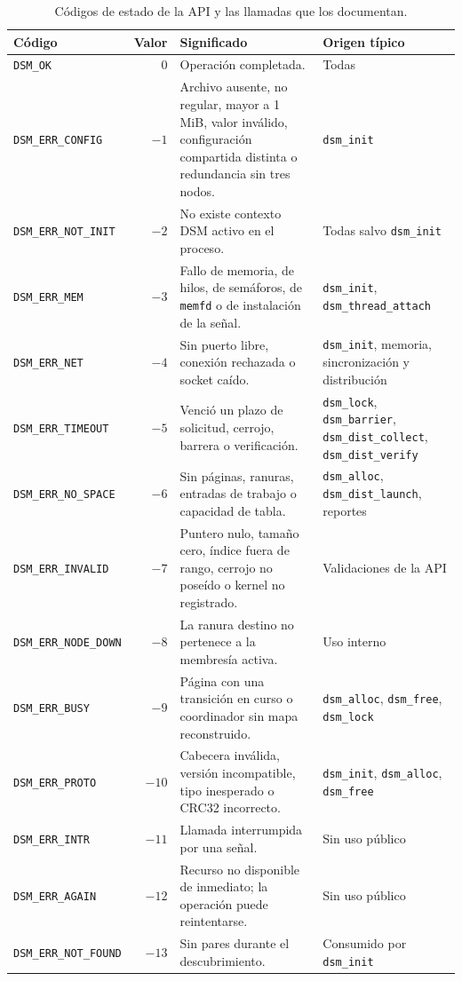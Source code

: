 \begin{table}[H]
\centering
\footnotesize
\begin{tabularx}{\linewidth}{l r Y >{\RaggedRight\arraybackslash{}}p{3.4cm}}
\toprule
\textbf{Código} & \textbf{Valor} & \textbf{Significado} & \textbf{Origen típico} \\
\midrule
\texttt{DSM\_OK} & 0 & Operación completada. & Todas \\
\texttt{DSM\_ERR\_CONFIG} & $-1$ & Archivo ausente, no regular, mayor a 1 MiB, valor inválido, configuración compartida distinta o redundancia sin tres nodos. & \texttt{dsm\_init} \\
\texttt{DSM\_ERR\_NOT\_INIT} & $-2$ & No existe contexto DSM activo en el proceso. & Todas salvo \texttt{dsm\_init} \\
\texttt{DSM\_ERR\_MEM} & $-3$ & Fallo de memoria, de hilos, de semáforos, de \texttt{memfd} o de instalación de la señal. & \texttt{dsm\_init}, \texttt{dsm\_thread\_attach} \\
\texttt{DSM\_ERR\_NET} & $-4$ & Sin puerto libre, conexión rechazada o socket caído. & \texttt{dsm\_init}, memoria, sincronización y distribución \\
\texttt{DSM\_ERR\_TIMEOUT} & $-5$ & Venció un plazo de solicitud, cerrojo, barrera o verificación. & \texttt{dsm\_lock}, \texttt{dsm\_barrier}, \texttt{dsm\_dist\_collect}, \texttt{dsm\_dist\_verify} \\
\texttt{DSM\_ERR\_NO\_SPACE} & $-6$ & Sin páginas, ranuras, entradas de trabajo o capacidad de tabla. & \texttt{dsm\_alloc}, \texttt{dsm\_dist\_launch}, reportes \\
\texttt{DSM\_ERR\_INVALID} & $-7$ & Puntero nulo, tamaño cero, índice fuera de rango, cerrojo no poseído o kernel no registrado. & Validaciones de la API \\
\texttt{DSM\_ERR\_NODE\_DOWN} & $-8$ & La ranura destino no pertenece a la membresía activa. & Uso interno \\
\texttt{DSM\_ERR\_BUSY} & $-9$ & Página con una transición en curso o coordinador sin mapa reconstruido. & \texttt{dsm\_alloc}, \texttt{dsm\_free}, \texttt{dsm\_lock} \\
\texttt{DSM\_ERR\_PROTO} & $-10$ & Cabecera inválida, versión incompatible, tipo inesperado o CRC32 incorrecto. & \texttt{dsm\_init}, \texttt{dsm\_alloc}, \texttt{dsm\_free} \\
\texttt{DSM\_ERR\_INTR} & $-11$ & Llamada interrumpida por una señal. & Sin uso público \\
\texttt{DSM\_ERR\_AGAIN} & $-12$ & Recurso no disponible de inmediato; la operación puede reintentarse. & Sin uso público \\
\texttt{DSM\_ERR\_NOT\_FOUND} & $-13$ & Sin pares durante el descubrimiento. & Consumido por \texttt{dsm\_init} \\
\bottomrule
\end{tabularx}
\caption{Códigos de estado de la API y las llamadas que los documentan.}
\label{tab:errores-api}
\end{table}

